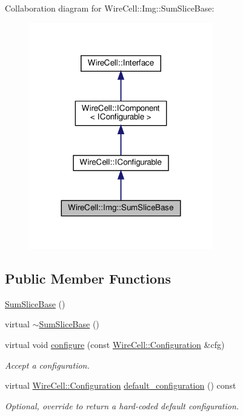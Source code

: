 Collaboration diagram for Wire\+Cell\+:\+:Img\+:\+:Sum\+Slice\+Base\+:
\nopagebreak
\begin{figure}[H]
\begin{center}
\leavevmode
\includegraphics[width=227pt]{class_wire_cell_1_1_img_1_1_sum_slice_base__coll__graph}
\end{center}
\end{figure}
\subsection*{Public Member Functions}
\begin{DoxyCompactItemize}
\item 
\hyperlink{class_wire_cell_1_1_img_1_1_sum_slice_base_ab45edb5d82e7950893e68e2f2272b289}{Sum\+Slice\+Base} ()
\item 
virtual \hyperlink{class_wire_cell_1_1_img_1_1_sum_slice_base_aa29c4757b69e8fe2da9b519995bb916f}{$\sim$\+Sum\+Slice\+Base} ()
\item 
virtual void \hyperlink{class_wire_cell_1_1_img_1_1_sum_slice_base_adcf3268fc426d4158c87d091370f93df}{configure} (const \hyperlink{namespace_wire_cell_a9f705541fc1d46c608b3d32c182333ee}{Wire\+Cell\+::\+Configuration} \&cfg)
\begin{DoxyCompactList}\small\item\em Accept a configuration. \end{DoxyCompactList}\item 
virtual \hyperlink{namespace_wire_cell_a9f705541fc1d46c608b3d32c182333ee}{Wire\+Cell\+::\+Configuration} \hyperlink{class_wire_cell_1_1_img_1_1_sum_slice_base_a2df3fdb91e31ad9d5051537bdc3ee124}{default\+\_\+configuration} () const
\begin{DoxyCompactList}\small\item\em Optional, override to return a hard-\/coded default configuration. \end{DoxyCompactList}\end{DoxyCompactItemize}

